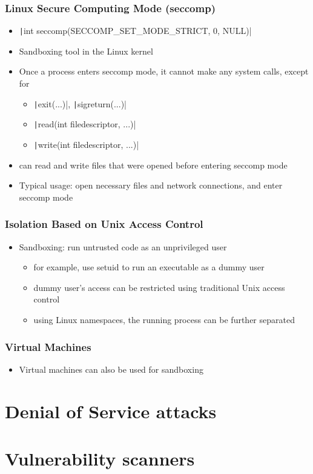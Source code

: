 \documentclass[final]{article}
\begin{document}
\subsubsection*{Linux Secure Computing Mode (seccomp)}
\begin{itemize}[nosep]
    \item \texttt|int seccomp(SECCOMP_SET_MODE_STRICT, 0, NULL)|
    \item Sandboxing tool in the Linux kernel
    \item Once a process enters seccomp mode, it cannot make any system calls, except for
          \begin{itemize}[nosep]
              \item \texttt|exit(...)|, \texttt|sigreturn(...)|
              \item \texttt|read(int filedescriptor, ...)|
              \item \texttt|write(int filedescriptor, ...)|
          \end{itemize}
    \item can read and write files that were opened before entering seccomp mode
    \item Typical usage: open necessary files and network connections, and enter seccomp mode
\end{itemize}
\subsubsection*{Isolation Based on Unix Access Control}
\begin{itemize}[nosep]
    \item Sandboxing: run untrusted code as an unprivileged user
          \begin{itemize}[nosep]
              \item for example, use setuid to run an executable as a dummy user
              \item dummy user's access can be restricted using traditional Unix access control
              \item using Linux namespaces, the running process can be further separated
          \end{itemize}
\end{itemize}
\subsubsection*{Virtual Machines}
\begin{itemize}[nosep]
    \item Virtual machines can also be used for sandboxing
\end{itemize}
\section{Denial of Service attacks}
\section{Vulnerability scanners}
\end{document}
